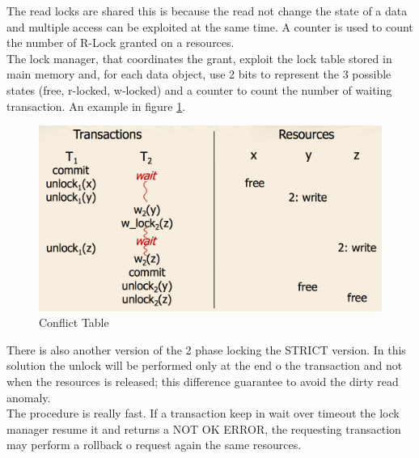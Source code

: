 \documentclass[12pt]{article}
\begin{document}
The read locks are shared this is because the read not change the state of a data and multiple access can be exploited at the same time. A counter is used to count the number of R-Lock granted on a resources.\\
The lock manager, that coordinates the grant, exploit the lock table stored in main memory and, for each data object, use 2 bits to represent the 3 possible states (free, r-locked, w-locked) and a counter to count the number of waiting transaction. An example in figure \ref{fig:TwoPhaseEx}.

\begin{figure}[h!]
  \includegraphics[width=\linewidth]{images/TwoPhaseEx.png}
  \caption{Conflict Table}
  \label{fig:TwoPhaseEx}
\end{figure}

There is also another version of the 2 phase locking the STRICT version. In this solution the unlock will be performed only at the end o the transaction and not when the resources is released; this difference guarantee to avoid the dirty read anomaly.\\
The procedure is really fast. If a transaction keep in wait over timeout the lock manager resume it and returns a NOT OK ERROR, the requesting transaction may perform a rollback o request again the same resources.

\end{document}
